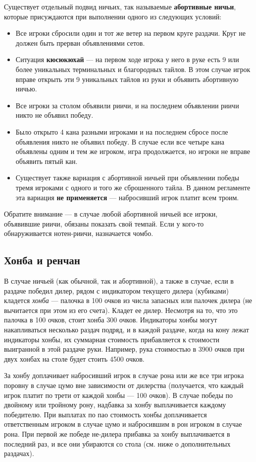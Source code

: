 Существует отдельный подвид ничьих, так называемые \textbf{абортивные ничьи}, которые присуждаются при выполнении одного из следующих условий:
\begin{itemize}
	\item Все игроки сбросили один и тот же ветер на первом круге раздачи. Круг не должен быть прерван объявлениями сетов.
	\item Ситуация \textbf{кюсюкюхай} --- на первом ходе игрока у него в руке есть 9 или более уникальных терминальных и благородных тайлов. В этом случае игрок вправе открыть эти 9 уникальных тайлов из руки и объявить абортивную ничью.
	\item Все игроки за столом объявили риичи, и на последнем объявлении риичи никто не объявил победу.
	\item Было открыто 4 кана разными игроками и на последнем сбросе после объявления никто не объявил победу. В случае если все четыре кана объявлены одним и тем же игроком, игра продолжается, но игроки не вправе объявить пятый кан. 
	\item Существует также вариация с абортивной ничьей при объявлении победы тремя игроками с одного и того же сброшенного тайла. В данном регламенте эта вариация \textbf{не применяется} --- набросивший игрок платит всем троим.
\end{itemize}

Обратите внимание --- в случае любой абортивной ничьей все игроки, объявившие риичи, обязаны показать свой темпай. Если у кого-то обнаруживается нотен-риичи, назначается чомбо.

\subsection{Хонба и ренчан}

В случае ничьей (как обычной, так и абортивной), а также в случае, если в раздаче победил дилер, рядом с индикатором текущего дилера (кубиками) кладется \textit{хонба} --- палочка в 100 очков из числа запасных или палочек дилера (не вычитается при этом из его счета). Кладет ее дилер. Несмотря на то, что это палочка в 100 очков, стоит хонба 300 очков. Индикаторы хонбы могут накапливаться несколько раздач подряд, и в каждой раздаче, когда на кону лежат индикаторы хонбы, их суммарная стоимость прибавляется к стоимости выигранной в этой раздаче руки. Например, рука стоимостью в 3900 очков при двух хонбах на столе будет стоить 4500 очков. 

За хонбу доплачивает набросивший игрок в случае рона или же все три игрока поровну в случае цумо вне зависимости от дилерства (получается, что каждый игрок платит по трети от каждой хонбы --- 100 очков). В случае победы по двойному или тройному рону, надбавка за хонбу выплачивается каждому победителю. При выплатах по пао стоимость хонбы доплачивается ответственным игроком в случае цумо и набросившим в рон игроком в случае рона. При первой же победе не-дилера прибавка за хонбу выплачивается в последний раз, и все они убираются со стола (см. ниже о дополнительных раздачах).

